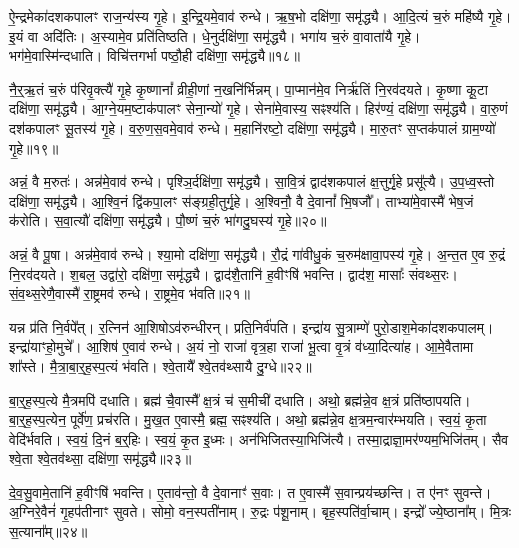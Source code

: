 ऐ॒न्द्रमेका॑\-दश\-कपालꣳ राज॒न्य॑स्य गृ॒हे।
इ॒न्द्रि॒यमे॒वाव॑ रुन्धे।
ऋ॒ष॒भो दक्षि॑णा॒ समृ॑द्ध्यै।
आ॒दि॒त्यं च॒रुं महि॑ष्यै गृ॒हे।
इ॒यं वा अदि॑तिः।
अ॒स्यामे॒व प्रति॑तिष्ठति।
धे॒नुर्दक्षि॑णा॒ समृ॑द्ध्यै।
भगा॑य च॒रुं वा॒वाता॑यै गृ॒हे।
भग॑मे॒वास्मि॑न्दधाति।
विचि॑त्तगर्भा पष्ठौ॒ही दक्षि॑णा॒ समृ॑द्ध्यै॥१८॥

नै॒र्॒ऋ॒तं च॒रुं प॑रिवृ॒क्त्यै॑ गृ॒हे कृ॒ष्णानां᳚ व्रीही॒णां न॒खनि॑र्भिन्नम्।
पा॒प्मान॑मे॒व निर्\mbox{}ऋ॑तिं नि॒रव॑दयते।
कृ॒ष्णा कू॒टा दक्षि॑णा॒ समृ॑द्ध्यै।
आ॒ग्ने॒यम॒ष्टा\-क॑पालꣳ सेना॒न्यो॑ गृ॒हे।
सेना॑मे॒वास्य॒ सꣴश्य॑ति।
हिर॑ण्यं॒ दक्षि॑णा॒ समृ॑द्ध्यै।
वा॒रु॒णं दश॑कपालꣳ सू॒तस्य॑ गृ॒हे।
व॒रु॒ण॒स॒वमे॒वाव॑ रुन्धे।
म॒हानि॑रष्टो॒ दक्षि॑णा॒ समृ॑द्ध्यै।
मा॒रु॒तꣳ स॒प्तक॑पालं ग्राम॒ण्यो॑ गृ॒हे॥१९॥

अन्नं॒ वै म॒रुतः॑।
अन्न॑मे॒वाव॑ रुन्धे।
पृश्ञि॒र्दक्षि॑णा॒ समृ॑द्ध्यै।
सा॒वि॒त्रं द्वाद॑शकपालं क्ष॒त्तुर्गृ॒हे प्रसू᳚त्यै।
उ॒प॒ध्व॒स्तो दक्षि॑णा॒ समृ॑द्ध्यै।
आ॒श्वि॒नं द्वि॑कपा॒लꣳ स॑ङ्ग्रही॒तुर्गृ॒हे।
अ॒श्विनौ॒ वै दे॒वानां᳚ भि॒षजौ᳚।
ताभ्या॑मे॒वास्मै॑ भेष॒जं क॑रोति।
स॒वा॒त्यौ॑ दक्षि॑णा॒ समृ॑द्ध्यै।
पौ॒ष्णं च॒रुं भा॑गदु॒घस्य॑ गृ॒हे॥२०॥

अन्नं॒ वै पू॒षा।
अन्न॑मे॒वाव॑ रुन्धे।
श्या॒मो दक्षि॑णा॒ समृ॑द्ध्यै।
रौ॒द्रं गा॑वीधु॒कं च॒रुम॑क्षावा॒पस्य॑ गृ॒हे।
अ॒न्त॒त ए॒व रु॒द्रं नि॒रव॑दयते।
श॒बल॒ उद्वा॑रो॒ दक्षि॑णा॒ समृ॑द्ध्यै।
द्वाद॑शै॒तानि॑ ह॒वीꣳषि॑ भवन्ति।
द्वाद॑श॒ मासाः᳚ संवथ्स॒रः।
सं॒व॒थ्स॒रेणै॒वास्मै॑ रा॒ष्ट्रमव॑ रुन्धे।
रा॒ष्ट्रमे॒व भ॑वति॥२१॥

यन्न प्र॑ति नि॒र्वपे᳚त्।
र॒त्निन॑ आ॒शिषो\-ऽव॑रुन्धीरन्।
प्रति॒निर्व॑पति।
इन्द्रा॑य सु॒त्राम्णे॑ पुरो॒डाश॒मेका॑\-दश\-कपालम्।
इन्द्रा॑याꣳहो॒मुचे᳚।
आ॒शिष॑ ए॒वाव॑ रुन्धे।
अ॒यं नो॒ राजा॑ वृत्र॒हा राजा॑ भू॒त्वा वृ॒त्रं व॑ध्या॒दित्या॑ह।
आ॒\-मे॒वैतामा शा᳚स्ते।
मै॒त्रा॒बा॒र्॒ह॒स्प॒त्यं भ॑वति।
श्वे॒तायै᳚ श्वे॒तव॑थ्सायै दु॒ग्धे॥२२॥

बा॒र्॒ह॒स्प॒त्ये मै॒त्रमपि॑ दधाति।
ब्रह्म॑ चै॒वास्मै᳚ क्ष॒त्रं च॑ स॒मीची॑ दधाति।
अथो॒ ब्रह्म॑न्ने॒व क्ष॒त्रं प्रति॑\-ष्ठापयति।
बा॒र्॒ह॒स्प॒त्येन॒ पूर्वे॑ण॒ प्रच॑रति।
मु॒ख॒त ए॒वास्मै॒ ब्रह्म॒ सꣴश्य॑ति।
अथो॒ ब्रह्म॑न्ने॒व क्ष॒त्रम॒न्वार॑म्भयति।
स्व॒यं॒ कृ॒ता वेदि॑र्भवति।
स्व॒यं॒ दि॒नं ब॒र्॒हिः।
स्व॒यं॒ कृ॒त इ॒ध्मः।
अन॑भिजितस्या॒भिजि॑त्यै।
तस्मा॒द्राज्ञा॒मर॑ण्यम॒भिजि॑तम्।
सैव श्वे॒ता श्वे॒तव॑थ्सा॒ दक्षि॑णा॒ समृ॑द्ध्यै॥२३॥\anuvakamend[र॒त्नि॒त्वाय॒ समृ॑द्ध्यै पष्ठौ॒ही दक्षि॑णा॒ समृ॑द्ध्यै ग्राम॒ण्यो॑ गृ॒हे भा॑गदु॒घस्य॑ गृ॒हे भ॑वति दु॒ग्धे॑\-ऽभिजि॑त्यै॒ द्वे च॑]

दे॒व॒सु॒वामे॒तानि॑ ह॒वीꣳषि॑ भवन्ति।
ए॒ताव॑न्तो॒ वै दे॒वानाꣳ॑ स॒वाः।
त ए॒वास्मै॑ स॒वान्प्रय॑च्छन्ति।
त ए॑नꣳ सुवन्ते।
अ॒ग्निरे॒वैनं॑ गृ॒हप॑तीनाꣳ सुवते।
सोमो॒ वन॒स्पती॑नाम्।
रु॒द्रः प॑शू॒नाम्।
बृह॒स्पति॑र्वा॒चाम्।
इन्द्रो᳚ ज्ये॒ष्ठाना᳚म्।
मि॒त्रः स॒त्याना᳚म्॥२४॥

